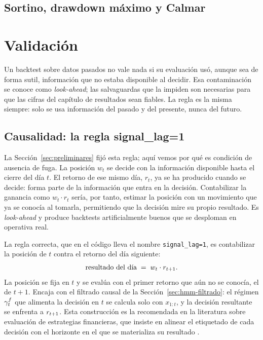 \subsection{Sortino, drawdown máximo y Calmar}
\label{sec:economia-otros}

\section{Validación}
\label{sec:cpcv}

Un backtest sobre datos pasados no vale nada si su evaluación usó, aunque sea de forma sutil, información que no estaba disponible al decidir. Esa contaminación se conoce como \emph{look-ahead}; las salvaguardas que la impiden son necesarias para que las cifras del capítulo de resultados sean fiables. La regla es la misma siempre: solo se usa información del pasado y del presente, nunca del futuro.

\subsection{Causalidad: la regla signal\_lag=1}
\label{sec:cpcv-causalidad}

La Sección~\ref{sec:preliminares} fijó esta regla; aquí vemos por qué es condición de ausencia de fuga. La posición $w_t$ se decide con la información disponible hasta el cierre del día $t$. El retorno de ese mismo día, $r_t$, ya se ha producido cuando se decide: forma parte de la información que entra en la decisión. Contabilizar la ganancia como $w_t \cdot r_t$ sería, por tanto, estimar la posición con un movimiento que ya se conocía al tomarla, permitiendo que la decisión mire su propio resultado. Es \emph{look-ahead} y produce backtests artificialmente buenos que se desploman en operativa real.

La regla correcta, que en el código lleva el nombre \texttt{signal\_lag=1}, es contabilizar la posición de $t$ contra el retorno del día siguiente:
\[
\text{resultado del día} \;=\; w_t \cdot r_{t+1}.
\]
La posición se fija en $t$ y se evalúa con el primer retorno que aún no se conocía, el de $t+1$. Encaja con el filtrado causal de la Sección~\ref{sec:hmm-filtrado}: el régimen $\gamma^{f}_t$ que alimenta la decisión en $t$ se calcula solo con $x_{1:t}$, y la decisión resultante se enfrenta a $r_{t+1}$. Esta construcción es la recomendada en la literatura sobre evaluación de estrategias financieras, que insiste en alinear el etiquetado de cada decisión con el horizonte en el que se materializa su resultado \cite{lopezdeprado2018}.

